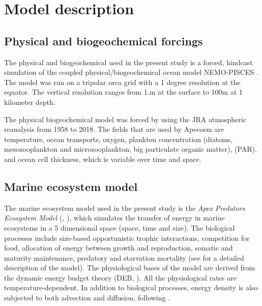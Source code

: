 \section{Model description}

\subsection{Physical and biogeochemical forcings}

The physical and biogeochemical used in the present study is a forced, hindcast simulation of the coupled physical/biogeochemical 
ocean model NEMO-PISCES \citep{aumontPISCESv2OceanBiogeochemical2015}. The model was run on a tripolar orca grid \citep{madecGlobalOceanMesh1996} with a
1 degree resolution at the equator. The vertical resolution ranges from 1.m at the surface to 100m at 1 kilometer depth.

The physical biogeochemical model was forced by using the JRA atmospheric reanalysis \citep{kobayashiJRA55ReanalysisGeneral2015} from 1958 to 2018.
The fields that are used by Apecosm are temperature, ocean transports, 
oxygen, plankton concentration (diatoms, mesozooplankton and microzooplankton, big particulate organic matter), 
\ppar (PAR). and ocean cell thickness, which is variable over time and space.\\


\subsection{Marine ecosystem model}

The marine ecosystem model used in the present study is the \emph{Apex Predators Ecosystem Model} (\ap, \citealt{mauryModelingEnvironmentalEffects2007,mauryOverviewAPECOSMSpatialized2010}), which simulates 
the transfer of energy in marine ecosystems in a 5 dimensional space (space, time and size).
The biological processes include size-based opportunistic trophic interactions, competition for food, allocation of energy between growth and reproduction, somatic and maturity maintenance, predatory and starvation mortality (see \citealt{mauryModelingEnvironmentalEffects2007} for a detailed description of the model).
The physiological bases of the model are derived from the dynamic energy budget theory (DEB, \citealt{kooijmanDynamicEnergyMass2000}).
All the physiological rates are temperature-dependent.  In addition to biological processes, energy density 
is also subjected to both advection and diffusion, following \cite{faugerasAdvectiondiffusionreactionSizestructuredFish2005}.

